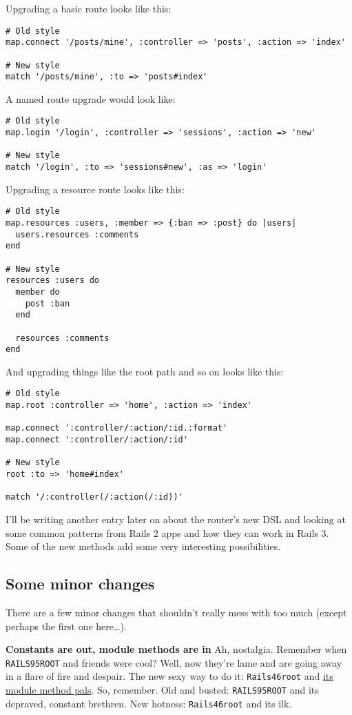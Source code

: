 \documentclass{book}
\begin{document}
Upgrading a basic route looks like this:

\begin{verbatim}# Old style
map.connect '/posts/mine', :controller => 'posts', :action => 'index'

# New style
match '/posts/mine', :to => 'posts#index'\end{verbatim}
A named route upgrade would look like:

\begin{verbatim}# Old style
map.login '/login', :controller => 'sessions', :action => 'new'

# New style
match '/login', :to => 'sessions#new', :as => 'login'\end{verbatim}
Upgrading a resource route looks like this:

\begin{verbatim}# Old style
map.resources :users, :member => {:ban => :post} do |users|
  users.resources :comments
end

# New style
resources :users do
  member do
    post :ban
  end

  resources :comments
end\end{verbatim}
And upgrading things like the root path and so on looks like this:

\begin{verbatim}# Old style
map.root :controller => 'home', :action => 'index'

map.connect ':controller/:action/:id.:format'
map.connect ':controller/:action/:id'

# New style
root :to => 'home#index'

match '/:controller(/:action(/:id))'\end{verbatim}
I'{}ll be writing another entry later on about the router'{}s new DSL and looking at some common patterns from Rails 2 apps and how they can work in Rails 3. Some of the new methods add some very interesting possibilities.

\hypertarget{some_minor_changes}{}\subsection*{{Some minor changes}}\label{some_minor_changes}

There are a few minor changes that shouldn'{}t really mess with too much (except perhaps the first one here\ldots{}).

\textbf{Constants are out, module methods are in} Ah, nostalgia. Remember when {\colorbox[rgb]{0.87,0.87,0.87}{\tt RAILS\char95ROOT}} and friends were cool? Well, now they'{}re lame and are going away in a flare of fire and despair. The new sexy way to do it: {\colorbox[rgb]{0.87,0.87,0.87}{\tt Rails\char46root}} and \href{http://api.rubyonrails.org/classes/Rails.html}{its module method pals}. So, remember. Old and busted: {\colorbox[rgb]{0.87,0.87,0.87}{\tt RAILS\char95ROOT}} and its depraved, constant brethren. New hotness: {\colorbox[rgb]{0.87,0.87,0.87}{\tt Rails\char46root}} and its ilk.
\end{document}
